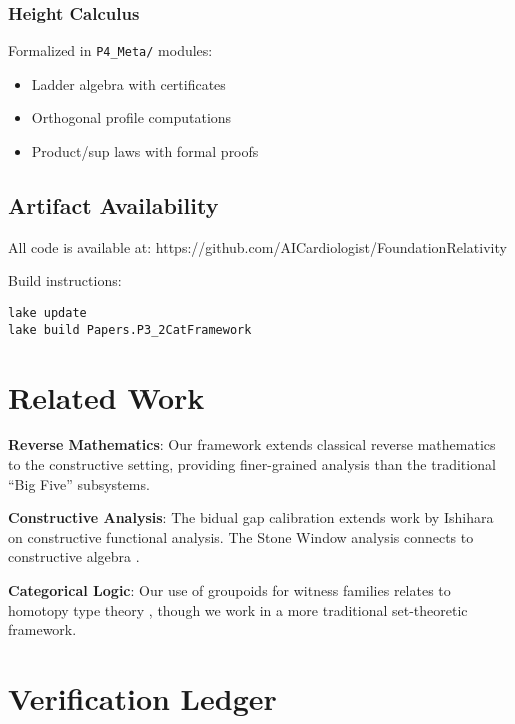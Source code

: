 \documentclass[11pt]{article}
\begin{document}
\subsubsection{Height Calculus}

Formalized in \texttt{P4\_Meta/} modules:
\begin{itemize}
\item Ladder algebra with certificates
\item Orthogonal profile computations
\item Product/sup laws with formal proofs
\end{itemize}

\subsection{Artifact Availability}

All code is available at: https://github.com/AICardiologist/FoundationRelativity

Build instructions:
\begin{verbatim}
lake update
lake build Papers.P3_2CatFramework
\end{verbatim}

\section{Related Work}

\textbf{Reverse Mathematics}: Our framework extends classical reverse mathematics \cite{Simpson} to the constructive setting, providing finer-grained analysis than the traditional ``Big Five'' subsystems.

\textbf{Constructive Analysis}: The bidual gap calibration extends work by Ishihara \cite{Ishihara} on constructive functional analysis. The Stone Window analysis connects to constructive algebra \cite{Mines}.

\textbf{Categorical Logic}: Our use of groupoids for witness families relates to homotopy type theory \cite{HoTT}, though we work in a more traditional set-theoretic framework.

\appendix
\section{Verification Ledger}\label{app:verification}
\end{document}
